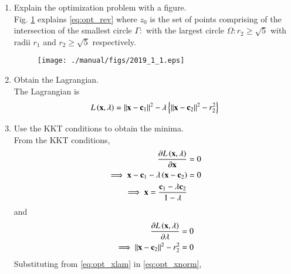 \documentclass[journal,12pt,twocolumn]{IEEEtran}
\renewcommand\thesection{\arabic{section}}
\begin{document}
\begin{enumerate}[label=\thesection.\arabic*
,ref=\thesection.\theenumi]
%
%
%
%
%
\item Explain the optimization problem with a figure.
\\
\solution
Fig. \ref{fig:2019_1} explains \eqref{eq:opt_rev}
where $z_0$ is the set of points comprising of the intersection of the 
smallest circle $\Gamma:$ with the largest circle $\Omega: r_2 \ge 
\sqrt{5}$ 
with radii 
$r_1$ and 
$r_2 \ge \sqrt{5}$ respectively.
\begin{figure}[!ht]
\centering
\texttt{[image: ./manual/figs/2019\_1\_1.eps]}
\caption{}
\label{fig:2019_1}
\end{figure}
%
\item Obtain the Lagrangian.
\\
\solution
The Lagrangian is 
\begin{align}
L \left(\mathbf{x},\lambda\right) = \left\Vert\mathbf{x} - \mathbf{c}_1\right\Vert^2 - \lambda 
\left\{\left\Vert\mathbf{x} - \mathbf{c}_2\right\Vert^2-r_2^2\right\}
\end{align}
\item Use the KKT conditions to obtain the minima.
\\
\solution
From the KKT conditions, 
\begin{align}
\frac{\partial L \brak{\vec{x},\lambda}}{\partial \vec{x}} &= 0
\\
\implies {\vec{x} - \vec{c}_1} - \lambda \brak{\vec{x} - \vec{c}_2} &= 0
\\
\implies \vec{x}  = \frac{\vec{c}_1 -\lambda  \vec{c}_2}{1-\lambda } &
\label{eq:opt_xlam}
\end{align}
%
and 
\begin{align}
\frac{\partial L \brak{\vec{x},\lambda}}{\partial \lambda} &= 0
\\
\implies \norm{\vec{x} - \vec{c}_2}^2-r_2^2 &= 0
\label{eq:opt_xnorm}
\end{align}
Substituting from \eqref{eq:opt_xlam} in \eqref{eq:opt_xnorm},

\end{enumerate}
\end{document}
